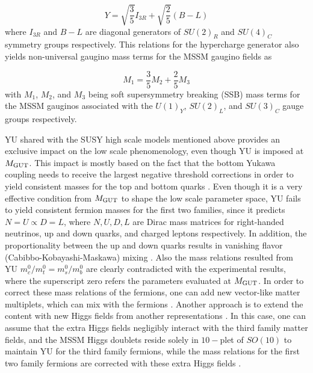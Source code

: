 \documentclass[12pt]{article}
\newcommand{\mgut}{M_{{\rm GUT}}}
\begin{document}
\begin{equation}
Y=\sqrt{\frac{3}{5}}I_{3R}+\sqrt{\frac{2}{5}}(B-L)
\end{equation}
where $I_{3R}$ and $B-L$ are diagonal generators of $SU(2)_{R}$ and $SU(4)_{C}$ symmetry groups respectively. This relations for the hypercharge generator also yields non-universal gaugino mass terms for the MSSM gaugino fields as

\begin{equation}
M_{1}=\frac{3}{5}M_{2}+\frac{2}{5}M_{3}
\label{422gauginos}
\end{equation}
with $M_{1}$, $M_{2}$, and $M_{3}$ being soft supersymmetry breaking (SSB) mass terms for the MSSM gauginos associated with the $U(1)_{Y}$, $SU(2)_{L}$, and $SU(3)_{C}$ gauge groups respectively.

YU shared with the SUSY high scale models mentioned above provides an exclusive impact on the low scale phenomenology, even though YU is imposed at $\mgut$. This impact is mostly based on the fact that the bottom Yukawa coupling needs to receive the largest negative threshold corrections in order to yield consistent masses for the top and bottom quarks \cite{Gogoladze:2010fu}. Even though it is a very effective condition from $\mgut$ to shape the low scale parameter space, YU fails to yield consistent fermion masses for the first two families, since it predicts $N=U\propto D=L$, where $N,U,D,L$ are Dirac mass matrices for right-handed neutrinos, up and down quarks, and charged leptons respectively. In addition, the proportionality between the up and down quarks results in vanishing flavor (Cabibbo-Kobayashi-Maskawa) mixing \cite{Langacker:1980js}. Also the mass relations resulted from YU $m_{c}^{0}/m_{t}^{0}=m_{s}^{0}/m_{b}^{0}$ are clearly contradicted with the experimental results, where the superscript zero refers the parameters evaluated at $\mgut$. In order to correct these mass relations of the fermions, one can add new vector-like matter multiplets, which can mix with the fermions \cite{Witten:1979nr}. Another approach is to extend the content with new Higgs fields from another representations \cite{Babu:1992ia}. In this case, one can assume that the extra Higgs fields negligibly interact with the third family matter fields, and the MSSM Higgs doublets reside solely in $10-$plet of $SO(10)$ to maintain YU for the third family fermions, while the mass relations for the first two family fermions are corrected with these extra Higgs fields \cite{Joshipura:2012sr}. 
\end{document}

